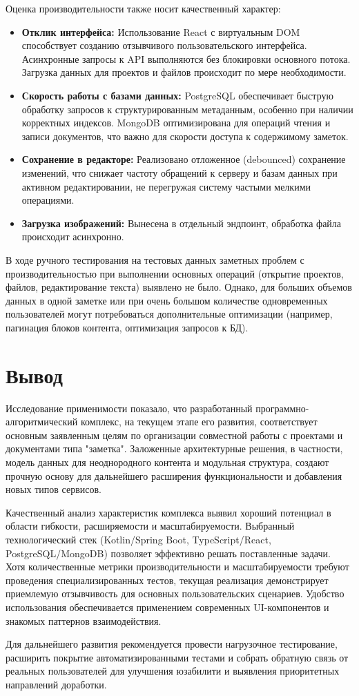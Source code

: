 Оценка производительности также носит качественный характер:
\begin{itemize}
    \item \textbf{Отклик интерфейса:} Использование React с виртуальным DOM способствует созданию отзывчивого пользовательского интерфейса. Асинхронные запросы к API выполняются без блокировки основного потока. Загрузка данных для проектов и файлов происходит по мере необходимости.
    \item \textbf{Скорость работы с базами данных:} PostgreSQL обеспечивает быструю обработку запросов к структурированным метаданным, особенно при наличии корректных индексов. MongoDB оптимизирована для операций чтения и записи документов, что важно для скорости доступа к содержимому заметок.
    \item \textbf{Сохранение в редакторе:} Реализовано отложенное (debounced) сохранение изменений, что снижает частоту обращений к серверу и базам данных при активном редактировании, не перегружая систему частыми мелкими операциями.
    \item \textbf{Загрузка изображений:} Вынесена в отдельный эндпоинт, обработка файла происходит асинхронно.
\end{itemize}
В ходе ручного тестирования на тестовых данных заметных проблем с производительностью при выполнении основных операций (открытие проектов, файлов, редактирование текста) выявлено не было. 
Однако, для больших объемов данных в одной заметке или при очень большом количестве одновременных пользователей могут потребоваться дополнительные оптимизации (например, пагинация блоков контента, оптимизация запросов к БД).

\section*{Вывод}

Исследование применимости показало, что разработанный программно-алгоритмический комплекс, на текущем этапе его развития, соответствует основным заявленным целям по организации совместной работы с проектами и документами типа "заметка". 
Заложенные архитектурные решения, в частности, модель данных для неоднородного контента и модульная структура, создают прочную основу для дальнейшего расширения функциональности и добавления новых типов сервисов.

Качественный анализ характеристик комплекса выявил хороший потенциал в области гибкости, расширяемости и масштабируемости. 
Выбранный технологический стек (Kotlin/Spring Boot, TypeScript/React, PostgreSQL/MongoDB) позволяет эффективно решать поставленные задачи. 
Хотя количественные метрики производительности и масштабируемости требуют проведения специализированных тестов, текущая реализация демонстрирует приемлемую отзывчивость для основных пользовательских сценариев. 
Удобство использования обеспечивается применением современных UI-компонентов и знакомых паттернов взаимодействия.

Для дальнейшего развития рекомендуется провести нагрузочное тестирование, расширить покрытие автоматизированными тестами и собрать обратную связь от реальных пользователей для улучшения юзабилити и выявления приоритетных направлений доработки.
